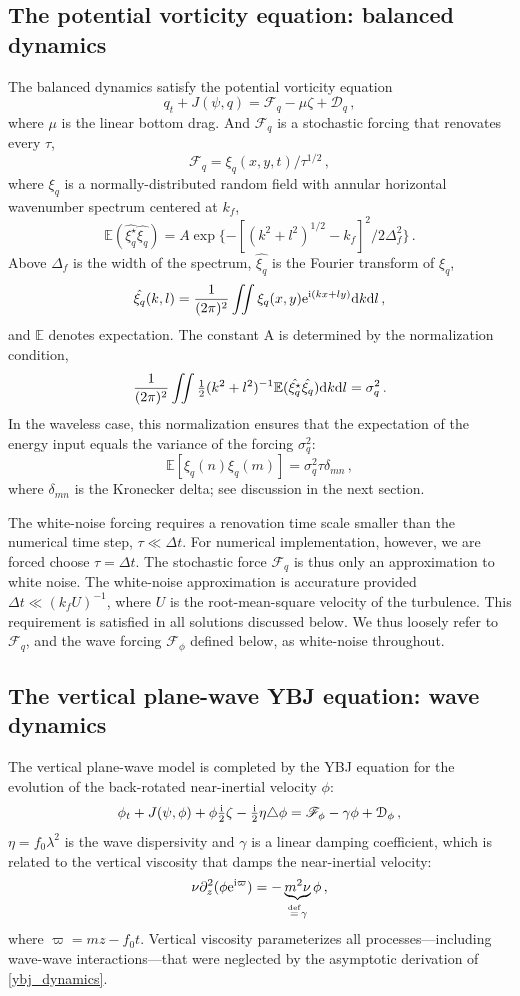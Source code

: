 \documentclass[12pt]{article}
\newcommand{\defn}{\ensuremath{\stackrel{\mathrm{def}}{=}}}
\newcommand{\per}{\, .}
\newcommand{\com}{\, ,}
\def\beq{\begin{equation}}
\def\eeq{\end{equation}}
\newcommand{\lap}{\triangle}
\newcommand{\half}{\tfrac{1}{2}}
\def\ii{{\rm i}}
\def\dd{{\rm d}}
\def\ee{{\rm e}}
\newcommand{\F}{{\mathscr{F}}}
\newcommand{\p}{\ensuremath{\partial}}
\newcommand{\?}{\stackrel{?}{=}}
\newcommand{\D}{\mathcal{D}}
\newcommand{\Hf}{\boldsymbol{\mathcal{H}}}
\newcommand{\disp}{\eta}
\newcommand{\ze}{\zeta}
\newcommand{\Es}{\mathbb{E}}
\begin{document}
\subsection{The potential vorticity equation: balanced dynamics}
The balanced dynamics satisfy the potential vorticity equation
\beq
q_t + J(\psi,q)  = \F_q -\mu \zeta + \D_q \com
\label{balanced_dynamics}
\eeq
where $\mu$ is the linear bottom drag. And $\F_q$ is a
stochastic forcing that renovates every $\tau$,
\renewcommand{\Hf}{\mathcal{H}}
\beq
\label{F_q}
\F_q = \xi_q(x,y,t)/\tau^{1/2}\com
\eeq
where $\xi_q$ is a normally-distributed random field with annular horizontal wavenumber spectrum
centered at $k_f$,
\beq
\label{spec_forcing}
\Es(\hat{\xi_q^\star}\hat{\xi_q}) =  A \exp\big\{{-[(k^2+l^2)^{1/2}-k_f]^2/2\Delta_f^2}\big\}\per
\eeq
Above $\Delta_f$ is the width of the spectrum, $\hat{\xi_q}$ is the Fourier transform of $\xi_q$,
\beq
\hat{\xi_q}(k,l) = \frac{1}{(2\pi)^2}\iint \xi_q(x,y)\ee^{\ii(kx + ly)}\dd k \dd l\com
\eeq
and $\Es$ denotes expectation. The constant A is determined by the normalization condition,
\beq
\label{norm_fq}
\frac{1}{(2\pi)^2}\iint\half(k^2 + l^2)^{-1}\Es(\hat{\xi_q^\star}\hat{\xi_q}) \dd k \dd l= \sigma_q^2\per
\eeq
In the waveless case, this normalization ensures that
the expectation of the energy input equals the variance of the forcing $\sigma_q^2$:
\beq
\Es[\xi_q(n)\xi_q(m)]= \sigma_q^2 \tau \delta_{mn}\com
\eeq
where $\delta_{mn}$ is the Kronecker delta; see discussion in the next section.

The white-noise forcing requires a renovation time scale smaller than
the numerical time step, $\tau \ll \Delta t$. For numerical implementation,
however, we are forced choose $\tau = \Delta t$. The stochastic force $\F_q$
is thus only an approximation to white noise. The white-noise approximation is
accurature provided $\Delta t \ll (k_f U)^{-1}$, where $U$ is the root-mean-square
velocity of the turbulence. This requirement is satisfied in all solutions discussed
below. We thus loosely refer to $\F_q$, and
the wave forcing $\F_\phi$ defined below, as white-noise throughout.

\subsection{The vertical plane-wave YBJ equation: wave dynamics}
The vertical plane-wave model is completed by the YBJ equation for the evolution
of the back-rotated near-inertial velocity $\phi$:
\beq
\phi_t + J(\psi,\phi) +  \phi \tfrac{\ii}{2}\ze - \tfrac{\ii}{2} \disp \lap \phi
 = \F_\phi -\gamma \phi + \D_\phi\com
 \label{ybj_dynamics}
\eeq
$\eta = f_0\lambda^2$ is the wave dispersivity and  $\gamma$
is a linear damping coefficient, which is related to the vertical viscosity
that damps the near-inertial velocity:
\beq
\nu \p_z^2(\phi \ee^{\ii \varpi}) = - \underbrace{m^2\nu}_{\defn \gamma}\phi\com
\eeq
where $\varpi = mz - f_0 t$. Vertical viscosity parameterizes
all processes---including wave-wave interactions---that were neglected by the
asymptotic derivation of \eqref{ybj_dynamics}.
\end{document}
